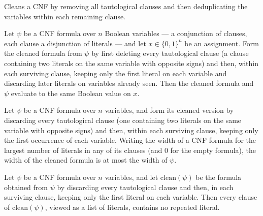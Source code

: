 \begin{definition}
\label{LMN.cleanCNF_D3}
\leanok
{}
Cleans a CNF by removing all tautological clauses and then deduplicating the variables
within each remaining clause.
\end{definition}

\begin{lemma}
\label{LMN.cleanCNF_D3_eval}
\leanok
{}
Let $\psi$ be a CNF formula over $n$ Boolean variables — a conjunction of clauses, each
clause a disjunction of literals — and let $x \in \{0,1\}^n$ be an assignment. Form the
cleaned formula from $\psi$ by first deleting every tautological clause (a clause
containing two literals on the same variable with opposite signs) and then, within each
surviving clause, keeping only the first literal on each variable and discarding later
literals on variables already seen. Then the cleaned formula and $\psi$ evaluate to the
same Boolean value on $x$.
\end{lemma}

\begin{lemma}
\label{LMN.cleanCNF_D3_width_le}
\leanok
{}
Let $\psi$ be a CNF formula over $n$ variables, and form its cleaned version by
discarding every tautological clause (one containing two literals on the same variable
with opposite signs) and then, within each surviving clause, keeping only the first
occurrence of each variable. Writing the width of a CNF formula for the largest number
of literals in any of its clauses (and $0$ for the empty formula), the width of the
cleaned formula is at most the width of $\psi$.
\end{lemma}

\begin{lemma}
\label{LMN.cleanCNF_D3_nodup}
\leanok
{}
Let $\psi$ be a CNF formula over $n$ variables, and let $\mathrm{clean}(\psi)$ be the
formula obtained from $\psi$ by discarding every tautological clause and then, in each
surviving clause, keeping only the first literal on each variable. Then every clause of
$\mathrm{clean}(\psi)$, viewed as a list of literals, contains no repeated literal.
\end{lemma}


